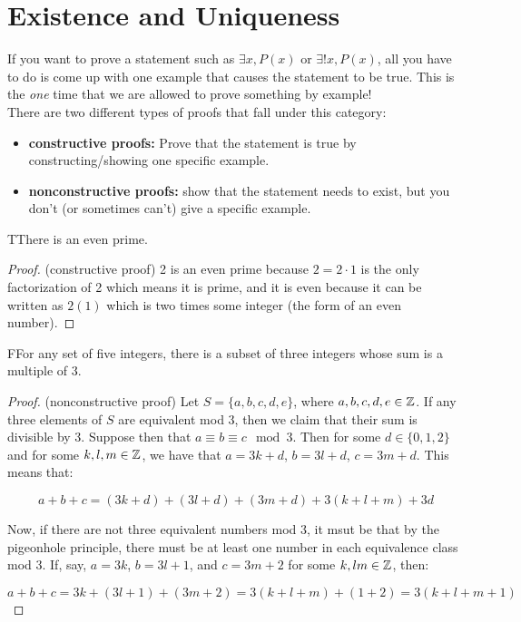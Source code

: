\section{Existence and Uniqueness}

If you want to prove a statement such as $\exists x, P(x)$ or $\exists ! x, P(x)$, all you have to do is come up with one example that causes the statement to be true. This is the \textit{one} time that we are allowed to prove something by example!\\

There are two different types of proofs that fall under this category:

\begin{itemize}
    \item \textbf{constructive proofs:} Prove that the statement is true by constructing/showing one specific example. 
    \item \textbf{nonconstructive proofs:} show that the statement needs to exist, but you don't (or sometimes can't) give a specific example.
\end{itemize}


\begin{proposition}
    TThere is an even prime.
\end{proposition}

\begin{proof}
    (constructive proof) 2 is an even prime because $2=2\cdot 1$ is the only factorization of 2 which means it is prime, and it is even because it can be written as $2(1)$ which is two times some integer (the form of an even number). 
\end{proof}


\begin{proposition}
    FFor any set of five integers, there is a subset of three integers whose sum is a multiple of 3. 
\end{proposition}

\begin{proof}
    (nonconstructive proof) Let $S = \{a,b,c,d,e\}$, where $a,b,c,d,e\in\mathbb{Z}$. If any three elements of $S$ are equivalent mod 3, then we claim that their sum is divisible by 3. Suppose then that $a\equiv b\equiv c \mod 3$. Then for some $d \in \{0,1,2\}$ and for some $k,l,m\in\mathbb{Z}$, we have that $a=3k+d$, $b=3l+d$, $c=3m+d$. This means that:

    \[
        a+b+c = (3k+d) + (3l+d) + (3m+d) + 3(k+l+m) + 3d  
    \]

    Now, if there are not three equivalent numbers mod 3, it msut be that by the pigeonhole principle, there must be at least one number in each equivalence class mod 3. If, say, $a=3k$, $b=3l+1$, and $c=3m+2$ for some $k,lm\in\mathbb{Z}$, then:

    \[
        a + b + c = 3k + (3l+1) + (3m+2) = 3(k+l+m) + (1+2) = 3(k+l+m+1)  
    \]
\end{proof}